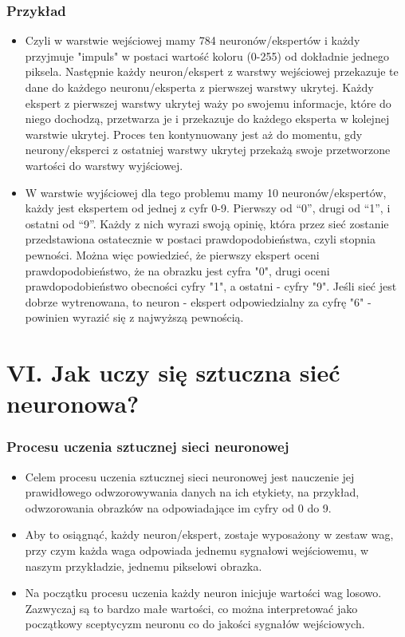 \documentclass{beamer}
\begin{document}
\begin{frame}[fragile]
\frametitle{Przykład}
\begin{itemize}
\item Czyli w warstwie wejściowej mamy 784 neuronów/ekspertów i każdy przyjmuje "impuls" w postaci wartość koloru (0-255) od dokładnie jednego piksela. Następnie każdy neuron/ekspert z warstwy wejściowej przekazuje te dane do każdego neuronu/eksperta z pierwszej warstwy ukrytej. Każdy ekspert z pierwszej warstwy ukrytej waży po swojemu informacje, które do niego dochodzą, przetwarza je i przekazuje do każdego eksperta w kolejnej warstwie ukrytej. Proces ten kontynuowany jest aż do momentu, gdy neurony/eksperci z ostatniej warstwy ukrytej przekażą swoje przetworzone wartości do warstwy wyjściowej.
\item W warstwie wyjściowej dla tego problemu mamy 10 neuronów/ekspertów, każdy jest ekspertem od jednej z cyfr 0-9. Pierwszy od “0”, drugi od “1”, i ostatni od “9”. Każdy z nich wyrazi swoją opinię, która przez sieć zostanie przedstawiona ostatecznie w postaci prawdopodobieństwa, czyli stopnia pewności. Można więc powiedzieć, że pierwszy ekspert oceni prawdopodobieństwo, że na obrazku jest cyfra "0", drugi oceni prawdopodobieństwo obecności cyfry "1", a ostatni - cyfry "9". Jeśli sieć jest dobrze wytrenowana, to neuron - ekspert odpowiedzialny za cyfrę "6" - powinien wyrazić się z najwyższą pewnością. 
\end{itemize}

\end{frame}

\section{VI. Jak uczy się sztuczna sieć neuronowa?}

\begin{frame}[fragile]
\frametitle{Procesu uczenia sztucznej sieci neuronowej}
 \begin{itemize}
\item Celem procesu uczenia sztucznej sieci neuronowej jest nauczenie jej prawidłowego odwzorowywania danych na ich etykiety, na przykład, odwzorowania obrazków na odpowiadające im cyfry od 0 do 9.
\item Aby to osiągnąć, każdy neuron/ekspert, zostaje wyposażony w zestaw wag, przy czym każda waga odpowiada jednemu sygnałowi wejściowemu, w naszym przykładzie, jednemu pikselowi obrazka. 
\item Na początku procesu uczenia każdy neuron inicjuje wartości wag losowo. Zazwyczaj są to bardzo małe wartości, co można interpretować jako początkowy sceptycyzm neuronu co do jakości sygnałów wejściowych. 
\end{itemize}
\end{frame}
\end{document}
